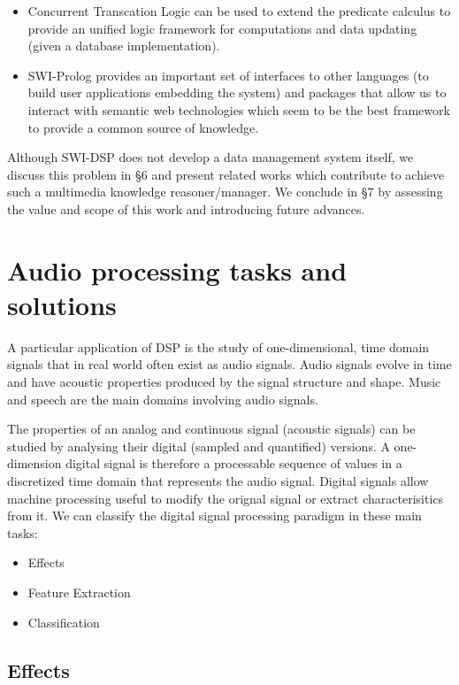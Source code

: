 \documentclass[runningheads]{llncs}
\begin{document}
\begin{itemize}
 \item Concurrent Transcation Logic can be used to extend the predicate calculus to provide an unified logic framework for computations and data updating (given a database implementation).
 \item SWI-Prolog provides an important set of interfaces to other languages (to build user applications embedding the system) and packages that allow us to interact with semantic web technologies which seem to be the best framework to provide a common source of knowledge.
\end{itemize}

Although SWI-DSP does not develop a data management system itself, we discuss this problem in \S 6 and present related works which contribute to achieve such a multimedia knowledge reasoner/manager. We conclude in \S 7 by assessing the value and scope of this work and introducing future advances.

\section{Audio processing tasks and solutions}\label{sec:tasks}

A particular application of DSP is the study of one-dimensional, time domain signals that in real world often exist as audio signals. Audio signals evolve in time and have acoustic properties produced by the signal structure and shape. Music and speech are the main domains involving audio signals.

The properties of an analog and continuous signal (acoustic signals) can be studied by analysing their digital (sampled and quantified) versions. A one-dimension digital signal is therefore a processable sequence of values in a discretized time domain that represents the audio signal. Digital signals allow machine processing useful to modify the orignal signal or extract characterisitics from it. We can classify the digital signal processing paradigm in these main tasks:

\begin{itemize}
 \item Effects
 \item Feature Extraction
 \item Classification
\end{itemize}

\subsection{Effects}\label{subsec:effects}
\end{document}
